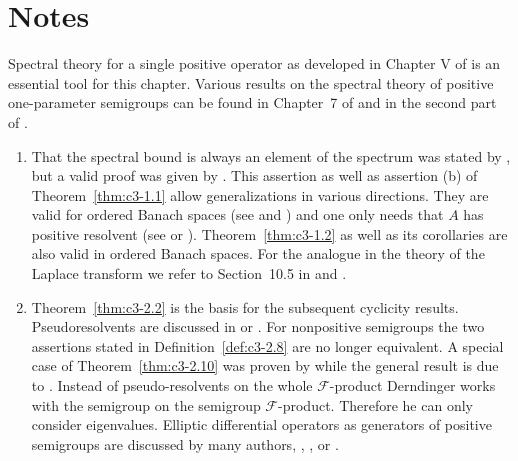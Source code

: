 \section*{Notes}

Spectral theory for a single positive operator as developed in Chapter V of \citet{schaefer:1974} is an essential tool for this chapter. 
Various results on the spectral theory of positive one-parameter semigroups can be found in Chapter~7 of \citet{davies:1980} and in the second part of \citet{battyrobinson:1984}.

\begin{enumerate}[label=\emph{Section \arabic*:}, wide, itemsep=1ex]
\item
That the spectral bound is always an element of the spectrum was stated by \citet{karlin:1959}, but a valid proof was given by \citet{derndinger:1980}. 
This assertion as well as assertion (b) of Theorem~\ref{thm:c3-1.1} allow generalizations in various directions.  
They are valid for ordered Banach spaces (see \citet{greinervoigtwolff:1981} and \citet{klein:1984}) and one only needs that $A$ has positive resolvent (see \citet{kato:1982} or \citet{nussbaum:1984}). 
Theorem~\ref{thm:c3-1.2} as well as its corollaries are also valid in ordered Banach spaces. 
For the analogue in the theory of the Laplace transform we refer to Section~10.5 in \citet{widder:1971} and \citet{voigt:1982}.

\item 
Theorem~\ref{thm:c3-2.2} is the basis for the subsequent cyclicity results. 
Pseudoresolvents are discussed \eg in \citet{hillephillips:1957} or \citet{yosida:1965}. 
For nonpositive semigroups the two assertions stated in Definition~\ref{def:c3-2.8} are no longer equivalent. 
A special case of Theorem~\ref{thm:c3-2.10} was proven by\citet{derndinger:1980} while the general result is due to \citet{greiner:1981}. Instead of pseudo-resolvents on the whole $\mathcal{F}$-product Derndinger works with the semigroup on the semigroup $\mathcal{F}$-product. 
Therefore he can only consider eigenvalues. 
Elliptic differential operators as generators of positive semigroups are discussed by many authors, \eg  \citet{amann:1983}, \citet{fattorini:1983}, \citet{friedman:1969} or \citet{pazy:1983}.


\end{enumerate}
